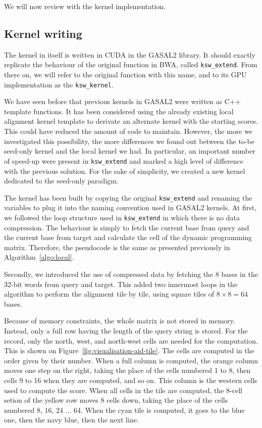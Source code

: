 We will now review with the kernel implementation.

\subsection{Kernel writing}
The kernel in itself is written in CUDA in the GASAL2 library. It should exactly replicate the behaviour of the original function in BWA, called \verb|ksw_extend|. From there on, we will refer to the original function with this name, and to its GPU implementation as the \verb|ksw_kernel|.

We have seen before that previous kernels in GASAL2 were written as C++ template functions. It has been considered using the already existing local alignment kernel template to derivate an alternate kernel with the starting scores. This could have reduced the amount of code to maintain. However, the more we investigated this possibility, the more differences we found out between the to-be seed-only kernel and the local kernel we had. In particular, an important number of speed-up were present in \verb|ksw_extend| and marked a high level of difference with the previous solution. For the sake of simplicity, we created a new kernel dedicated to the seed-only paradigm.

The kernel has been built by copying the original \verb|ksw_extend| and renaming the variables to plug it into the naming convention used in GASAL2 kernels. At first, we followed the loop structure used in \verb|ksw_extend| in which there is no data compression. The behaviour is simply to fetch the current base from query and the current base from target and calculate the cell of the dynamic programming matrix. Therefore, the pseudocode is the same as presented previously in Algorithm~\ref{algo:local}.

Secondly, we introduced the use of compressed data by fetching the 8 bases in the 32-bit words from query and target. This added two innermost loops in the algorithm to perform the alignment tile by tile, using square tiles of $8 \times 8 = 64$ bases.

Because of memory constraints, the whole matrix is not stored in memory. Instead, only a full row having the length of the query string is stored. For the record, only the north, west, and north-west cells are needed for the computation. This is shown on Figure~\ref{fig:visualisation-aid-tile}. The cells are computed in the order given by their number. When a full column is computed, the orange column moves one step on the right, taking the place of the cells numbered 1 to 8, then cells 9 to 16 when they are computed, and so on. This column is the western cells used to compute the score. When all cells in the tile are computed, the 8-cell setion of the yellow row moves 8 cells down, taking the place of the cells numbered 8, 16, 24 ... 64. When the cyan tile is computed, it goes to the blue one, then the navy blue, then the next line.

